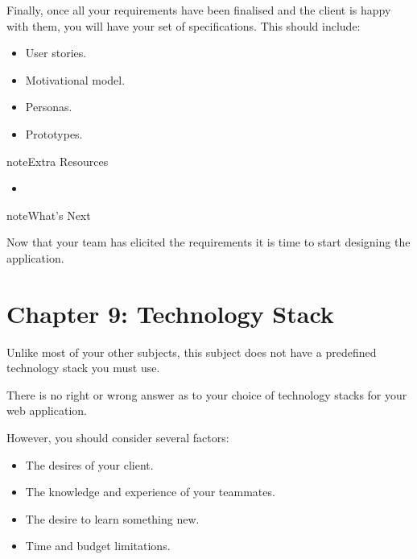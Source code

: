 \documentclass[letterpaper,10pt,english]{jupyterBook}
\begin{document}
\sphinxAtStartPar
Finally, once all your requirements have been finalised and the client
is happy with them, you will have your set of specifications. This
should include:
\begin{itemize}
\item {} 
\sphinxAtStartPar
User stories.

\item {} 
\sphinxAtStartPar
Motivational model.

\item {} 
\sphinxAtStartPar
Personas.

\item {} 
\sphinxAtStartPar
Prototypes.

\end{itemize}

\begin{sphinxadmonition}{note}{Extra Resources}
\begin{itemize}
\item {} 
\sphinxAtStartPar
{}

\end{itemize}
\end{sphinxadmonition}

\begin{sphinxadmonition}{note}{What’s Next}

\sphinxAtStartPar
Now that your team has elicited the requirements \sphinxhyphen{} it is time to start
designing the application.
\end{sphinxadmonition}


\chapter{Chapter 9: Technology Stack}
\label{\detokenize{chapter_9/technology_stack:chapter-9-technology-stack}}\label{\detokenize{chapter_9/technology_stack::doc}}
\sphinxAtStartPar
Unlike most of your other subjects, this subject does not have a
pre\sphinxhyphen{}defined technology stack you must use.

\sphinxAtStartPar
There is no right or wrong answer as to your choice of technology stacks
for your web application.

\sphinxAtStartPar
However, you should consider several factors:
\begin{itemize}
\item {} 
\sphinxAtStartPar
The desires of your client.

\item {} 
\sphinxAtStartPar
The knowledge and experience of your teammates.

\item {} 
\sphinxAtStartPar
The desire to learn something new.

\item {} 
\sphinxAtStartPar
Time and budget limitations.

\end{itemize}
\end{document}
